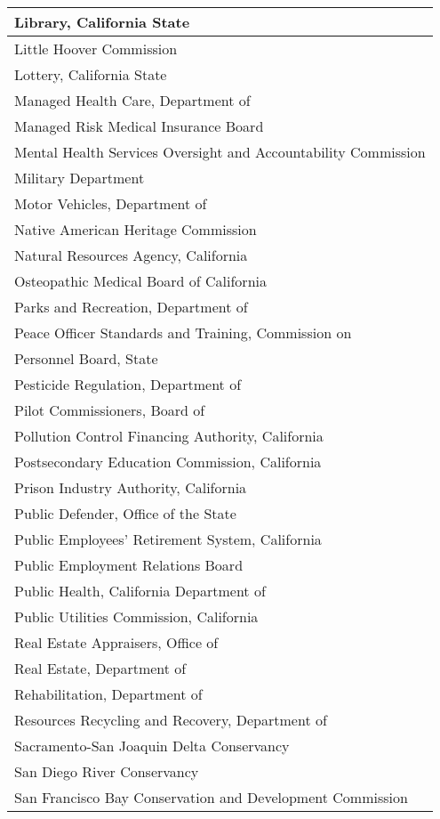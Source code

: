\documentclass[
]{article}
\begin{document}
\begin{table}
\begin{tabular}[t]{l}
Library, California State\\
\hline
Little Hoover Commission\\
\hline
Lottery, California State\\
\hline
Managed Health Care, Department of\\
\hline
Managed Risk Medical Insurance Board\\
\hline
Mental Health Services Oversight and Accountability Commission\\
\hline
Military Department\\
\hline
Motor Vehicles, Department of\\
\hline
Native American Heritage Commission\\
\hline
Natural Resources Agency, California\\
\hline
Osteopathic Medical Board of California\\
\hline
Parks and Recreation, Department of\\
\hline
Peace Officer Standards and Training, Commission on\\
\hline
Personnel Board, State\\
\hline
Pesticide Regulation, Department of\\
\hline
Pilot Commissioners, Board of\\
\hline
Pollution Control Financing Authority, California\\
\hline
Postsecondary Education Commission, California\\
\hline
Prison Industry Authority, California\\
\hline
Public Defender, Office of the State\\
\hline
Public Employees' Retirement System, California\\
\hline
Public Employment Relations Board\\
\hline
Public Health, California Department of\\
\hline
Public Utilities Commission, California\\
\hline
Real Estate Appraisers, Office of\\
\hline
Real Estate, Department of\\
\hline
Rehabilitation, Department of\\
\hline
Resources Recycling and Recovery, Department of\\
\hline
Sacramento-San Joaquin Delta Conservancy\\
\hline
San Diego River Conservancy\\
\hline
San Francisco Bay Conservation and Development Commission\\

\end{tabular}
\end{table}
\end{document}
